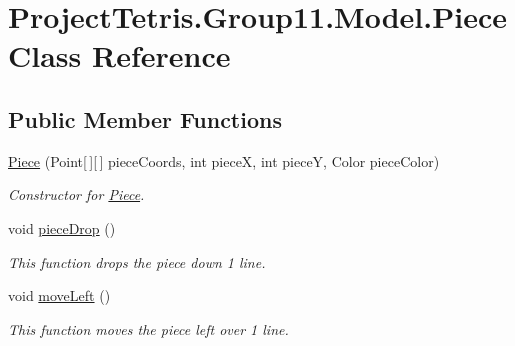 \hypertarget{class_project_tetris_1_1_group11_1_1_model_1_1_piece}{}\section{Project\+Tetris.\+Group11.\+Model.\+Piece Class Reference}
\label{class_project_tetris_1_1_group11_1_1_model_1_1_piece}
\subsection*{Public Member Functions}
\begin{DoxyCompactItemize}
\item 
\hyperlink{class_project_tetris_1_1_group11_1_1_model_1_1_piece_addee3c9cfed3f3a362cad4e89beaa27c}{Piece} (Point\mbox{[}$\,$\mbox{]}\mbox{[}$\,$\mbox{]} piece\+Coords, int pieceX, int pieceY, Color piece\+Color)
\begin{DoxyCompactList}\small\item\em Constructor for \hyperlink{class_project_tetris_1_1_group11_1_1_model_1_1_piece}{Piece}. \end{DoxyCompactList}\item 
\hypertarget{class_project_tetris_1_1_group11_1_1_model_1_1_piece_ac570b95abe339502c9d576673c734748}{}\label{class_project_tetris_1_1_group11_1_1_model_1_1_piece_ac570b95abe339502c9d576673c734748} 
void \hyperlink{class_project_tetris_1_1_group11_1_1_model_1_1_piece_ac570b95abe339502c9d576673c734748}{piece\+Drop} ()
\begin{DoxyCompactList}\small\item\em This function drops the piece down 1 line. \end{DoxyCompactList}\item 
\hypertarget{class_project_tetris_1_1_group11_1_1_model_1_1_piece_a3829a3fe63042cbd4765e59619a9147a}{}\label{class_project_tetris_1_1_group11_1_1_model_1_1_piece_a3829a3fe63042cbd4765e59619a9147a} 
void \hyperlink{class_project_tetris_1_1_group11_1_1_model_1_1_piece_a3829a3fe63042cbd4765e59619a9147a}{move\+Left} ()
\begin{DoxyCompactList}\small\item\em This function moves the piece left over 1 line. \end{DoxyCompactList}\item 
\hypertarget{class_project_tetris_1_1_group11_1_1_model_1_1_piece_ac2d30f3f8e7bb4f156b590ba41a1c24b}{}\label{class_project_tetris_1_1_group11_1_1_model_1_1_piece_ac2d30f3f8e7bb4f156b590ba41a1c24b} 

\end{DoxyCompactItemize}
